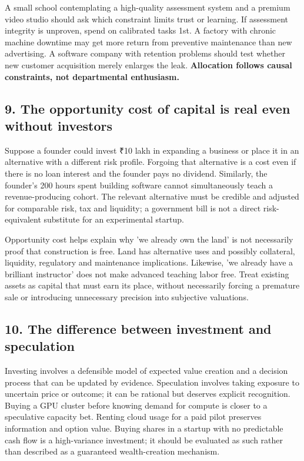 A small school contemplating a high-quality assessment system and a premium video studio should ask which constraint limits trust or learning. If assessment integrity is unproven, spend on calibrated tasks 1st. A factory with chronic machine downtime may get more return from preventive maintenance than new advertising. A software company with retention problems should test whether new customer acquisition merely enlarges the leak. \textbf{Allocation follows causal constraints, not departmental enthusiasm.}

\subsection{9. The opportunity cost of capital is real even without investors}


Suppose a founder could invest ₹10 lakh in expanding a business or place it in an alternative with a different risk profile. Forgoing that alternative is a cost even if there is no loan interest and the founder pays no dividend. Similarly, the founder's 200 hours spent building software cannot simultaneously teach a revenue-producing cohort. The relevant alternative must be credible and adjusted for comparable risk, tax and liquidity; a government bill is not a direct risk-equivalent substitute for an experimental startup.

Opportunity cost helps explain why 'we already own the land' is not necessarily proof that construction is free. Land has alternative uses and possibly collateral, liquidity, regulatory and maintenance implications. Likewise, 'we already have a brilliant instructor' does not make advanced teaching labor free. Treat existing assets as capital that must earn its place, without necessarily forcing a premature sale or introducing unnecessary precision into subjective valuations.

\subsection{10. The difference between investment and speculation}


Investing involves a defensible model of expected value creation and a decision process that can be updated by evidence. Speculation involves taking exposure to uncertain price or outcome; it can be rational but deserves explicit recognition. Buying a GPU cluster before knowing demand for compute is closer to a speculative capacity bet. Renting cloud usage for a paid pilot preserves information and option value. Buying shares in a startup with no predictable cash flow is a high-variance investment; it should be evaluated as such rather than described as a guaranteed wealth-creation mechanism.

